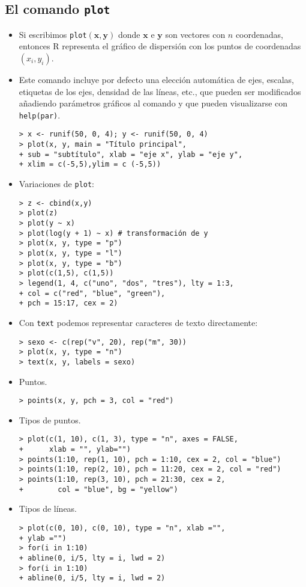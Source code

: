 \newslide

\subsection{El comando \texttt{plot}}

\begin{itemize}
\item Si escribimos \verb"plot"$(\mathbf{x},\mathbf{y})$ donde $\mathbf{x}$ e $\mathbf{y}$ son vectores con $n$ coordenadas, entonces R representa el gráfico de dispersión
con los puntos de coordenadas $(x_i,y_i)$.
\item Este comando incluye por defecto una elección automática de ejes,
escalas, etiquetas de los ejes, densidad de las líneas, etc., que pueden
ser modificados añadiendo parámetros gráficos al comando y que pueden
visualizarse con \verb"help(par)".
\begin{verbatim}
> x <- runif(50, 0, 4); y <- runif(50, 0, 4)
> plot(x, y, main = "Título principal",
+ sub = "subtítulo", xlab = "eje x", ylab = "eje y",
+ xlim = c(-5,5),ylim = c (-5,5))
\end{verbatim}

\newslide

\item Variaciones de \verb"plot":
\begin{verbatim}
> z <- cbind(x,y)
> plot(z)
> plot(y ~ x)
> plot(log(y + 1) ~ x) # transformación de y
> plot(x, y, type = "p")
> plot(x, y, type = "l")
> plot(x, y, type = "b")
> plot(c(1,5), c(1,5))
> legend(1, 4, c("uno", "dos", "tres"), lty = 1:3,
+ col = c("red", "blue", "green"),
+ pch = 15:17, cex = 2)
\end{verbatim}
\item Con \verb"text" podemos representar caracteres de texto directamente:
\begin{verbatim}
> sexo <- c(rep("v", 20), rep("m", 30))
> plot(x, y, type = "n")
> text(x, y, labels = sexo)
\end{verbatim}

\newslide

\item Puntos.
\begin{verbatim}
> points(x, y, pch = 3, col = "red")
\end{verbatim}
\item Tipos de puntos.
\begin{verbatim}
> plot(c(1, 10), c(1, 3), type = "n", axes = FALSE,
+      xlab = "", ylab="")
> points(1:10, rep(1, 10), pch = 1:10, cex = 2, col = "blue")
> points(1:10, rep(2, 10), pch = 11:20, cex = 2, col = "red")
> points(1:10, rep(3, 10), pch = 21:30, cex = 2,
+        col = "blue", bg = "yellow")
\end{verbatim}
\item Tipos de líneas.
\begin{verbatim}
> plot(c(0, 10), c(0, 10), type = "n", xlab ="",
+ ylab ="")
> for(i in 1:10)
+ abline(0, i/5, lty = i, lwd = 2)
> for(i in 1:10)
+ abline(0, i/5, lty = i, lwd = 2)
\end{verbatim}


\end{itemize}
